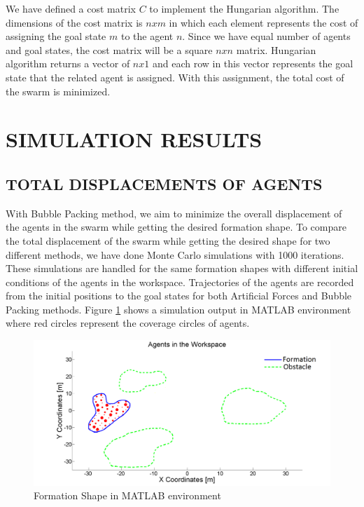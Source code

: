 \documentclass[letterpaper, 10 pt, conference]{ieeeconf}  %
\begin{document}
We have defined a cost matrix  $C$ to implement the Hungarian algorithm. The dimensions of the cost matrix is $nxm$ in which each element represents the cost of assigning the goal state $m$ to the agent $n$.  Since we have equal number of agents and goal states, the cost matrix will be a square $nxn$ matrix. Hungarian algorithm returns a vector of $nx1$ and each row in this vector represents the goal state that the related agent is assigned. With this assignment, the total cost of the swarm is minimized.

\section{SIMULATION RESULTS} 
\subsection{TOTAL DISPLACEMENTS OF AGENTS}  \label{total_dist_ref}
		
With Bubble Packing method, we aim to minimize the overall displacement of the agents in the swarm while getting the desired formation shape. To compare the total displacement of the swarm while getting the desired shape for two different methods, we have done Monte Carlo simulations with 1000 iterations. These simulations are handled for the same formation shapes with different initial conditions of the agents in the workspace. Trajectories of the agents are recorded from the initial positions to the goal states for both Artificial Forces and Bubble Packing methods. Figure \ref{shape1_ref} shows a simulation output in MATLAB environment where red circles represent the coverage circles of agents.		

\begin{figure}[thpb]
\caption{Formation Shape in MATLAB environment}\label{shape1_ref}
\centerline{\includegraphics[scale = 0.17]{Trajectories_Formation_Shape_1_2}}
\end{figure} 
\end{document}
